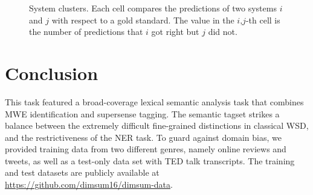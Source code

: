 \documentclass[11pt,letterpaper]{article}
\begin{document}
\begin{figure}
	\caption{System clusters. Each cell compares the predictions of two systems $i$ and $j$ with respect to a gold standard. The value in the $i$,$j$-th cell is the number of predictions that $i$ got right but $j$ did not.}
	\label{fig:system-clusters}
\end{figure}













\section{Conclusion}
This task featured a broad-coverage lexical semantic analysis task that combines MWE identification and supersense tagging. 
The semantic tagset strikes a balance between the extremely difficult fine-grained distinctions in classical WSD, 
and the restrictiveness of the NER task. To guard against domain bias, we provided training data 
from two different genres, namely online reviews and tweets, as well as a test-only data set with TED talk transcripts. 
The training and test datasets are publicly available at \url{https://github.com/dimsum16/dimsum-data}.
\end{document}
